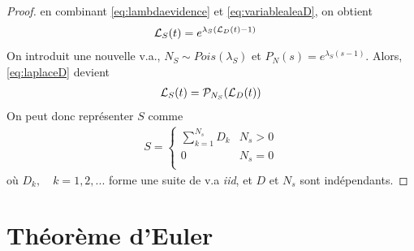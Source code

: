 \begin{proof}
en combinant \eqref{eq:lambdaevidence} et \eqref{eq:variablealeaD}, on obtient
\begin{align}
\label{eq:laplaceD}
\mathcal{L}_S(t)	& = e^{ \lambda_S \left( \mathcal{L}_D(t) - 1 \right)}
\end{align}
On introduit une nouvelle v.a., $N_S \sim Pois(\lambda_S)$ et $P_N(s) = e^{\lambda_S(s-1)}$. Alors, \eqref{eq:laplaceD} devient
\begin{align*}
\mathcal{L}_S(t) = \mathcal{P}_{N_S}(\mathcal{L}_D(t))
\end{align*}
On peut donc représenter $S$ comme
\begin{align*}
S = 
\begin{cases}
\sum_{k=1}^{N_s} D_k & N_s > 0 \\
0	& N_s = 0 \\
\end{cases}
\end{align*}
où $D_k, \quad k = 1,2,...$ forme une suite de v.a \textit{iid}, et $D$ et $N_s$ sont indépendants.
\end{proof}


\section{Théorème d'Euler}
\label{preuve:euler}
